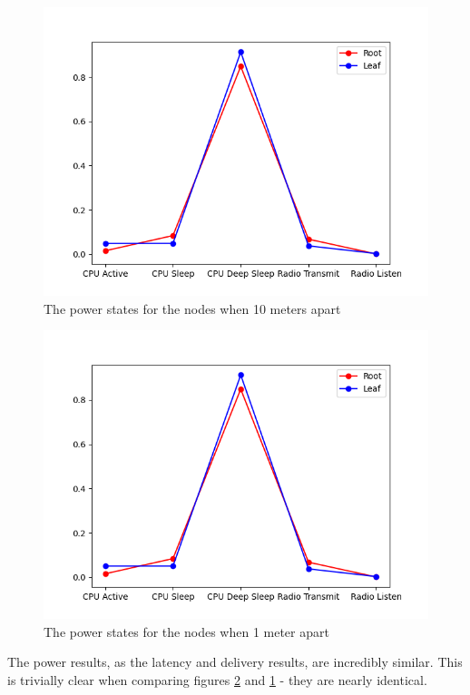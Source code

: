 \documentclass[conference]{IEEEtran}
\begin{document}
\begin{figure}[]
	\centering
	\includegraphics[width=\textwidth,keepaspectratio]{powerstates_10m.png}
	\caption{The power states for the nodes when 10 meters apart}
	\label{fig:power10m}
\end{figure}
\begin{figure}[]
	\centering
	\includegraphics[width=\textwidth,keepaspectratio]{powerstates_1m.png}
	\caption{The power states for the nodes when 1 meter apart}
	\label{fig:power1m}
\end{figure}

The power results, as the latency and delivery results, are incredibly similar. This is trivially clear when comparing figures \ref{fig:power1m} and \ref{fig:power10m} - they are nearly identical. 
\end{document}
